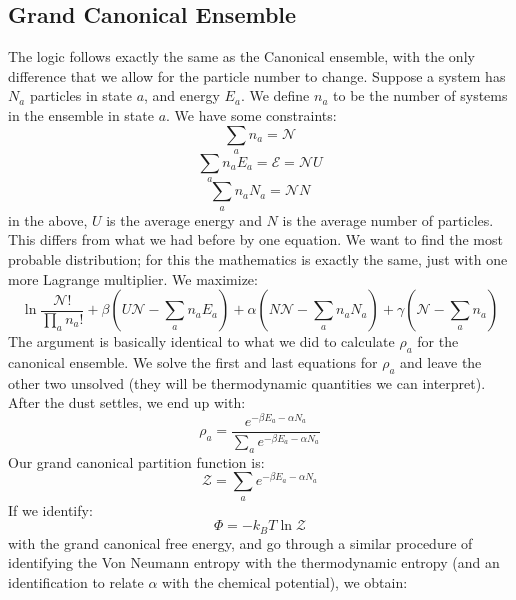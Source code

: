 \subsection{Grand Canonical Ensemble}
The logic follows exactly the same as the Canonical ensemble, with the only difference that we allow for the particle number to change. Suppose a system has $N_a$ particles in state $a$, and energy $E_a$. We define $n_a$ to be the number of systems in the ensemble in state $a$. We have some constraints:
\begin{equation}
    \sum_a n_a = \mathcal{N}
\end{equation}
\begin{equation}
    \sum_a n_a E_a = \mathcal{E} = \mathcal{N}U
\end{equation} 
\begin{equation}
    \sum_a n_a N_a = \mathcal{N}N
\end{equation}
in the above, $U$ is the average energy and $N$ is the average number of particles. This differs from what we had before by one equation. We want to find the most probable distribution; for this the mathematics is exactly the same, just with one more Lagrange multiplier. We maximize:
\begin{equation}
    \ln \frac{\mathcal{N}!}{\prod_a n_a !} + \beta(U\mathcal{N} - \sum_a n_a E_a) + \alpha\left(N\mathcal{N} - \sum_a n_a N_a\right) + \gamma\left(\mathcal{N} - \sum_a n_a\right)
\end{equation}
The argument is basically identical to what we did to calculate $\rho_a$ for the canonical ensemble. We solve the first and last equations for $\rho_a$ and leave the other two unsolved (they will be thermodynamic quantities we can interpret). After the dust settles, we end up with:
\begin{equation}
    \rho_a = \frac{e^{-\beta E_a - \alpha N_a}}{\sum_a e^{-\beta E_a - \alpha N_a}}
\end{equation}
Our grand canonical partition function is:
\begin{equation}
    \mathcal{Z} = \sum_a e^{-\beta E_a - \alpha N_a}
\end{equation}
If we identify:
\begin{equation}
    \Phi = -k_B T \ln \mathcal{Z}
\end{equation}
with the grand canonical free energy, and go through a similar procedure of identifying the Von Neumann entropy with the thermodynamic entropy (and an identification to relate $\alpha$ with the chemical potential), we obtain:
